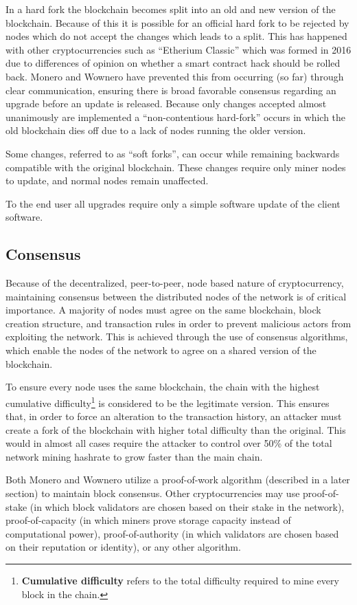 In a hard fork the blockchain becomes split into an old and new version of the blockchain\cite{hard_fork}. Because of this it is possible for an official hard fork to be rejected by nodes which do not accept the changes which leads to a split. This has happened with other cryptocurrencies such as ``Etherium Classic'' which was formed in 2016 due to differences of opinion on whether a smart contract hack should be rolled back\cite{eth_classic}. Monero and Wownero have prevented this from occurring (so far) through clear communication, ensuring there is broad favorable consensus regarding an upgrade before an update is released\cite{monero_upgrades}. Because only changes accepted almost unanimously are implemented a ``non-contentious hard-fork'' occurs in which the old blockchain dies off due to a lack of nodes running the older version.

Some changes, referred to as ``soft forks'', can occur while remaining backwards compatible with the original blockchain. These changes require only miner nodes to update, and normal nodes remain unaffected\cite{soft_fork}. 

To the end user all upgrades require only a simple software update of the client software\cite{monero_upgrades}.

\subsection{Consensus}
Because of the decentralized, peer-to-peer, node based nature of cryptocurrency, maintaining consensus between the distributed nodes of the network is of critical importance. A majority of nodes must agree on the same blockchain, block creation structure, and transaction rules in order to prevent malicious actors from exploiting the network. This is achieved through the use of consensus algorithms, which enable the nodes of the network to agree on a shared version of the blockchain.

To ensure every node uses the same blockchain, the chain with the highest cumulative difficulty\footnote{\textbf{Cumulative difficulty} refers to the total difficulty required to mine every block in the chain.} is considered to be the legitimate version\cite{zero2monero}. This ensures that, in order to force an alteration to the transaction history, an attacker must create a fork of the blockchain with higher total difficulty than the original. This would in almost all cases require the attacker to control over 50\% of the total network mining hashrate to grow faster than the main chain\cite{zero2monero}.

Both Monero and Wownero utilize a proof-of-work algorithm (described in a later section) to maintain block consensus\cite{monero_about,wowbsite}. Other cryptocurrencies may use proof-of-stake (in which block validators are chosen based on their stake in the network\cite{concensus_algorithms}), proof-of-capacity (in which miners prove storage capacity instead of computational power), proof-of-authority (in which validators are chosen based on their reputation or identity), or any other algorithm.
\pagebreak
